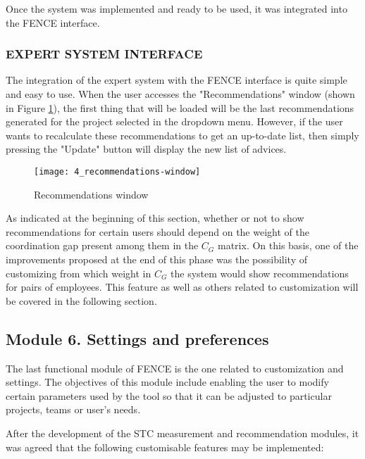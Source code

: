 Once the system was implemented and ready to be used, it was integrated into the FENCE interface.

\subsubsection{EXPERT SYSTEM INTERFACE}

The integration of the expert system with the FENCE interface is quite simple and easy to use. When the user accesses the "Recommendations" window (shown in Figure \ref{fig:recommendations}), the first thing that will be loaded will be the last recommendations generated for the project selected in the dropdown menu. However, if the user wants to recalculate these recommendations to get an up-to-date list, then simply pressing the "Update" button will display the new list of advices.

	\begin{figure}
		\centering
		\texttt{[image: 4\_recommendations-window]}
		\caption[Recommendations window]{Recommendations window}
		\label{fig:recommendations}
	\end{figure}

As indicated at the beginning of this section, whether or not to show recommendations for certain users should depend on the weight of the coordination gap present among them in the $C_G$ matrix. On this basis, one of the improvements proposed at the end of this phase was the possibility of customizing from which weight in $C_G$ the system would show recommendations for pairs of employees. This feature as well as others related to customization will be covered in the following section.

\subsection{Module 6. Settings and preferences}

The last functional module of FENCE is the one related to customization and settings. The objectives of this module include enabling the user to modify certain parameters used by the tool so that it can be adjusted to particular projects, teams or user’s needs.

After the development of the STC measurement and recommendation modules, it was agreed that the following customisable features may be implemented:

